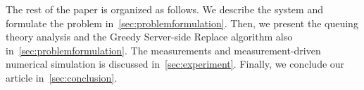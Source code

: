 The rest of the paper is organized as follows. We describe the system and formulate the problem in~\ref{sec:problemformulation}.
Then, we present the queuing theory analysis and the Greedy Server-side Replace algorithm also in~\ref{sec:problemformulation}.
The measurements and measurement-driven numerical simulation is discussed in~\ref{sec:experiment}. Finally, we 
conclude our article in~\ref{sec:conclusion}. 

